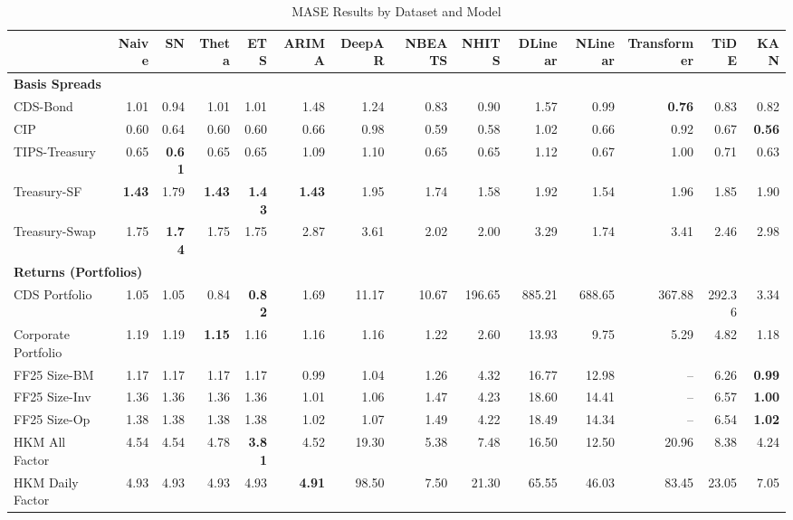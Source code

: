 
\begin{table}[htbp]
\centering
\caption{MASE Results by Dataset and Model}
\label{tab:mase_results}
\scriptsize
\setlength{\tabcolsep}{1.5pt}
\renewcommand{\arraystretch}{0.9}
\begin{tabular}{@{}lrrrrrrrrrrrrr@{}}
\toprule
 & Naive & SN & Theta & ETS & ARIMA & DeepAR & NBEATS & NHITS & DLinear & NLinear & Transformer & TiDE & KAN \\
\midrule
\multicolumn{14}{l}{\textbf{Basis Spreads}} \\
CDS-Bond & 1.01 & 0.94 & 1.01 & 1.01 & 1.48 & 1.24 & 0.83 & 0.90 & 1.57 & 0.99 & \textbf{0.76} & 0.83 & 0.82 \\
CIP & 0.60 & 0.64 & 0.60 & 0.60 & 0.66 & 0.98 & 0.59 & 0.58 & 1.02 & 0.66 & 0.92 & 0.67 & \textbf{0.56} \\
TIPS-Treasury & 0.65 & \textbf{0.61} & 0.65 & 0.65 & 1.09 & 1.10 & 0.65 & 0.65 & 1.12 & 0.67 & 1.00 & 0.71 & 0.63 \\
Treasury-SF & \textbf{1.43} & 1.79 & \textbf{1.43} & \textbf{1.43} & \textbf{1.43} & 1.95 & 1.74 & 1.58 & 1.92 & 1.54 & 1.96 & 1.85 & 1.90 \\
Treasury-Swap & 1.75 & \textbf{1.74} & 1.75 & 1.75 & 2.87 & 3.61 & 2.02 & 2.00 & 3.29 & 1.74 & 3.41 & 2.46 & 2.98 \\
\midrule
\multicolumn{14}{l}{\textbf{Returns (Portfolios)}} \\
CDS Portfolio & 1.05 & 1.05 & 0.84 & \textbf{0.82} & 1.69 & 11.17 & 10.67 & 196.65 & 885.21 & 688.65 & 367.88 & 292.36 & 3.34 \\
Corporate Portfolio & 1.19 & 1.19 & \textbf{1.15} & 1.16 & 1.16 & 1.16 & 1.22 & 2.60 & 13.93 & 9.75 & 5.29 & 4.82 & 1.18 \\
FF25 Size-BM & 1.17 & 1.17 & 1.17 & 1.17 & 0.99 & 1.04 & 1.26 & 4.32 & 16.77 & 12.98 & -- & 6.26 & \textbf{0.99} \\
FF25 Size-Inv & 1.36 & 1.36 & 1.36 & 1.36 & 1.01 & 1.06 & 1.47 & 4.23 & 18.60 & 14.41 & -- & 6.57 & \textbf{1.00} \\
FF25 Size-Op & 1.38 & 1.38 & 1.38 & 1.38 & 1.02 & 1.07 & 1.49 & 4.22 & 18.49 & 14.34 & -- & 6.54 & \textbf{1.02} \\
HKM All Factor & 4.54 & 4.54 & 4.78 & \textbf{3.81} & 4.52 & 19.30 & 5.38 & 7.48 & 16.50 & 12.50 & 20.96 & 8.38 & 4.24 \\
HKM Daily Factor & 4.93 & 4.93 & 4.93 & 4.93 & \textbf{4.91} & 98.50 & 7.50 & 21.30 & 65.55 & 46.03 & 83.45 & 23.05 & 7.05 \\

\end{tabular}
\end{table}
